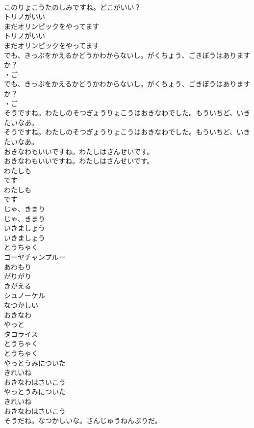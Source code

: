 \documentclass[8pt]{extreport}
\begin{document}
\begin{CJK}{UTF8}{min}
\\	このりょこうたのしみですね。どこがいい？
\\	トリノがいい
\\	まだオリンピックをやってます
\\	トリノがいい
\\	まだオリンピックをやってます
\\	でも、きっぷをかえるかどうかわからないし。がくちょう、ごきぼうはありますか？
\\	・ご 
\\	でも、きっぷをかえるかどうかわからないし。がくちょう、ごきぼうはありますか？
\\	・ご 
\\	そうですね。わたしのそつぎょうりょこうはおきなわでした。もういちど、いきたいなあ。
\\	そうですね。わたしのそつぎょうりょこうはおきなわでした。もういちど、いきたいなあ。
\\	おきなわもいいですね。わたしはさんせいです。
\\	おきなわもいいですね。わたしはさんせいです。
\\	わたしも
\\	です
\\	わたしも
\\	です
\\	じゃ、きまり
\\	じゃ、きまり
\\	いきましょう
\\	いきましょう
\\	とうちゃく
\\	ゴーヤチャンプルー
\\	あわもり
\\	がりがり
\\	きがえる
\\	シュノーケル
\\	なつかしい
\\	おきなわ
\\	やっと
\\	タコライス
\\	とうちゃく
\\	とうちゃく
\\	やっとうみについた
\\	きれいね
\\	おきなわはさいこう
\\	やっとうみについた
\\	きれいね
\\	おきなわはさいこう
\\	そうだね。なつかしいな。さんじゅうねんぶりだ。

\end{CJK}
\end{document}
